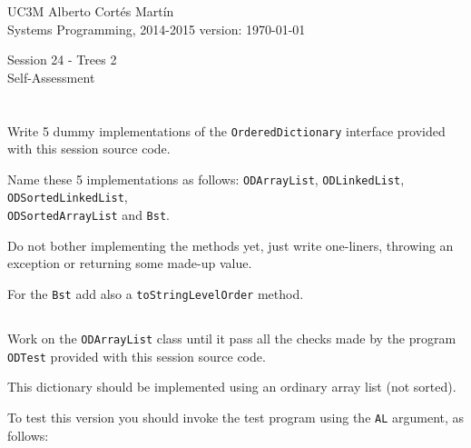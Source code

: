 \documentclass[a4paper, 11pt]{article}
\newcommand{\realtitle}{Session 24 - Trees 2}
\begin{document}
\makebox[\linewidth]{\rule{\textwidth}{0.4pt}}
UC3M \hfill Alberto Cortés Martín\\
Systems Programming, 2014-2015 \hfill version: \today\\
\makebox[\linewidth]{\rule{\textwidth}{0.4pt}}
\begin{center}
  \Large{\realtitle}\\Self-Assessment
\end{center}
\makebox[\linewidth]{\rule{\textwidth}{0.4pt}}
\vspace{1cm}

\section{}

\subsection{}

Write 5 dummy implementations of the \texttt{OrderedDictionary} interface provided with this session source code.

Name these 5 implementations as follows: \texttt{ODArrayList}, \texttt{ODLinkedList}, \texttt{ODSortedLinkedList}, \\
\texttt{ODSortedArrayList} and \texttt{Bst}.

Do not bother implementing the methods yet, just write one-liners, throwing an exception or returning some made-up value.

For the \texttt{Bst} add also a \texttt{toStringLevelOrder} method.

\subsection{}

Work on the \texttt{ODArrayList} class until it pass all the checks made by the program \texttt{ODTest} provided with this session source code.

This dictionary should be implemented using an ordinary array list (not sorted).

To test this version you should invoke the test program using the \texttt{AL} argument, as follows:

\end{document}

